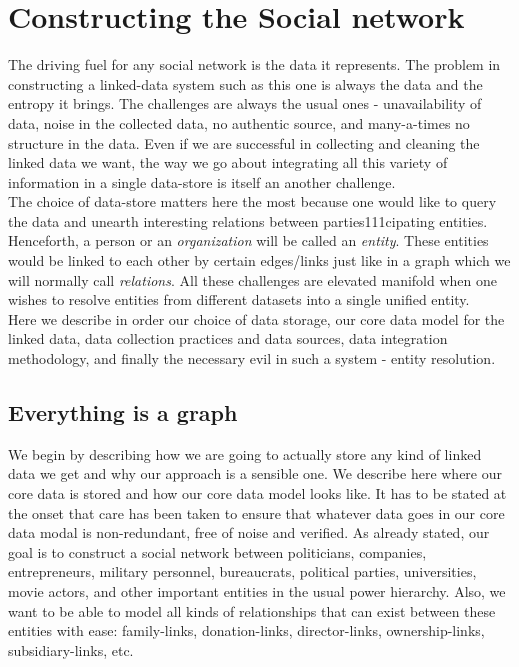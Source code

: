 \chapter{Constructing the Social network}

The driving fuel for any social network is the data it represents. The problem in constructing a linked-data system such as this one is always the data and the entropy it brings. The challenges are always the usual ones - unavailability of data, noise in the collected data, no authentic source, and many-a-times no structure in the data. Even if we are successful in collecting and cleaning the linked data we want, the way we go about integrating all this variety of information in a single data-store is itself an another challenge. \\

The choice of data-store matters here the most because one would like to query the data and unearth interesting relations between parties111cipating entities. Henceforth, a person or an \emph{organization} will be called an \emph{entity}. These entities would be linked to each other by certain edges/links just like in a graph which we will normally call \emph{relations}. All these challenges are elevated manifold when one wishes to resolve entities from different datasets into a single unified entity. \\

Here we describe in order our choice of data storage, our core data model for the linked data, data collection practices and data sources, data integration methodology, and finally the necessary evil in such a system -  entity resolution. \\

\section{Everything is a graph}
\label{datamodel}
We begin by describing how we are going to actually store any kind of linked data we get and why our approach is a sensible one. We describe here where our core data is stored and how our core data model looks like. It has to be stated at the onset that care has been taken to ensure that
whatever data goes in our core data modal is non-redundant, free of noise and verified. As already stated, our goal is to construct a social network between politicians, companies, entrepreneurs, military personnel, bureaucrats, political parties, universities, movie actors, and other important entities in the usual power hierarchy. Also, we want to be able to model all kinds of relationships that can exist between these entities with ease: family-links, donation-links, director-links, ownership-links, subsidiary-links, etc. \\

